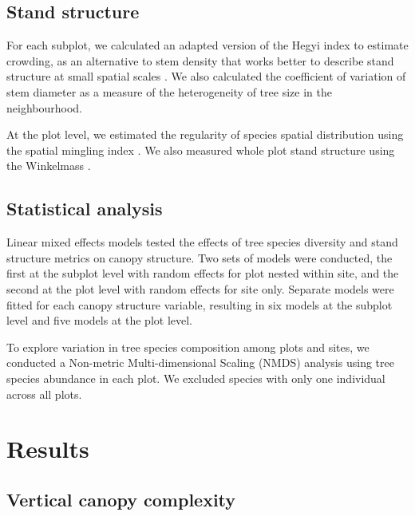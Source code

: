 \documentclass[11pt,a4paper]{article}
\begin{document}
\subsection{Stand structure}

For each subplot, we calculated an adapted version of the Hegyi index to estimate crowding, as an alternative to stem density that works better to describe stand structure at small spatial scales \citep{Hegyi1974}. We also calculated the coefficient of variation of stem diameter as a measure of the heterogeneity of tree size in the neighbourhood.

At the plot level, we estimated the regularity of species spatial distribution using the spatial mingling index \citep{Gadow}. We also measured whole plot stand structure using the Winkelmass \citep{}.

\subsection{Statistical analysis}

Linear mixed effects models tested the effects of tree species diversity and stand structure metrics on canopy structure. Two sets of models were conducted, the first at the subplot level with random effects for plot nested within site, and the second at the plot level with random effects for site only. Separate models were fitted for each canopy structure variable, resulting in six models at the subplot level and five models at the plot level.

To explore variation in tree species composition among plots and sites, we conducted a Non-metric Multi-dimensional Scaling (NMDS) analysis using tree species abundance in each plot. We excluded species with only one individual across all plots.  

\section{Results}

\subsection{Vertical canopy complexity}
\end{document}
